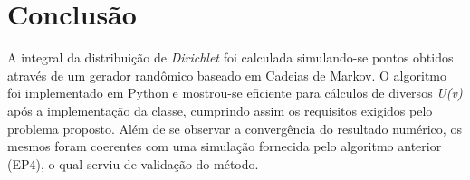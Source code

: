 \documentclass{article}
\begin{document}
\section{Conclusão}

\indent A integral da distribuição de \textit{Dirichlet} foi calculada simulando-se pontos obtidos através de um gerador randômico baseado em Cadeias de Markov. O algoritmo foi implementado em Python e mostrou-se eficiente para cálculos de diversos \textit{U(v)} após a implementação da classe, cumprindo assim os requisitos exigidos pelo problema proposto. Além de se observar a convergência do resultado numérico, os mesmos foram coerentes com uma simulação fornecida pelo algoritmo anterior (EP4), o qual serviu de validação do método.

\newpage


\end{document}
